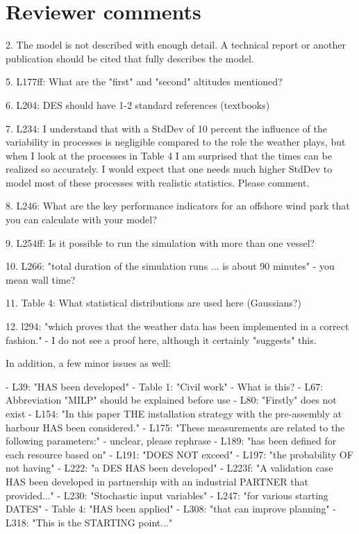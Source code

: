 \section{Reviewer comments}

2. The model is not described with enough detail. A technical report or another publication should be cited that fully describes the model.

5. L177ff: What are the "first" and "second" altitudes mentioned?

6. L204: DES should have 1-2 standard references (textbooks)

7. L234: I understand that with a StdDev of 10 percent the influence of the variability in processes is negligible compared to the role the weather plays, but when I look at the processes in Table 4 I am surprised that the times can be realized so accurately. I would expect that one needs much higher StdDev to model most of these processes with realistic statistics. Please comment.

8. L246: What are the key performance indicators for an offshore wind park that you can calculate with your model?

9. L254ff: Is it possible to run the simulation with more than one vessel?

10. L266: "total duration of the simulation runs ... is about 90 minutes" - you mean wall time?

11. Table 4: What statistical distributions are used here (Gaussians?)

12. l294: "which proves that the weather data has been implemented in a correct fashion." - I do not see a proof here, although it certainly "suggests" this.


In addition, a few minor issues as well:

- L39: "HAS been developed"
- Table 1: "Civil work" - What is this?
- L67: Abbreviation "MILP" should be explained before use
- L80: "Firstly" does not exist
- L154: "In this paper THE installation strategy with the pre-assembly at harbour HAS been considered."
- L175: "These measurements are related to the following parameters:" - unclear, please rephrase
- L189: "has been defined for each resource based on"
- L191: "DOES NOT exceed"
- L197: "the probability OF not having"
- L222: "a DES HAS been developed"
- L223f: "A validation case HAS been developed in partnership with an industrial PARTNER that provided..."
- L230: "Stochastic input variables"
- L247: "for various starting DATES"
- Table 4: "HAS been applied"
- L308: "that can improve planning"
- L318: "This is the STARTING point..."
